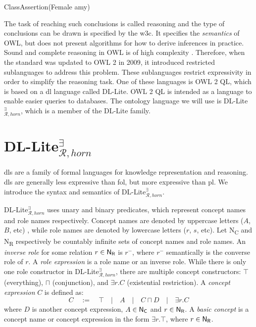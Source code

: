 \centerline{\textsf{ClassAssertion(Female amy)}}
The task of reaching such conclusions is called reasoning and the type of conclusions can be drawn is specified by the \gls{w3c}. It specifies the \emph{semantics} of OWL, but does not present algorithms for how to derive inferences in practice. Sound and complete reasoning in OWL is of high complexity \citeauthor{Krotzsch2012}. Therefore, when the standard was updated to OWL 2 in 2009, it introduced restricted sublanguages to address this problem. These sublanguages restrict expressivity in order to simplify the reasoning task. One of these languages is OWL 2 QL, which is based on a \gls{dl} language called DL-Lite. OWL 2 QL is intended as a language to enable easier queries to databases. The ontology language we will use is DL-Lite$_{\mathcal{R}, horn}^{\exists}$, which is a member of the DL-Lite family.

\section{DL-Lite$_{\mathcal{R}, horn}^{\exists}$}
\glspl{dl} are a family of formal languages for knowledge representation and reasoning. \glspl{dl} are generally less expressive than \gls{fol}, but more expressive than \gls{pl}. We introduce the syntax and semantics of  DL-Lite$_{\mathcal{R}, horn}^{\exists}$.

DL-Lite$_{\mathcal{R}, horn}^{\exists}$ uses unary and binary predicates, which represent concept names and role names respectively. Concept names are denoted by uppercase letters ($A$, $B$, etc) , while role names are denoted by lowercase letters ($r$, $s$, etc). Let \textsf{N\textsubscript{C}} and \textsf{N\textsubscript{R}} respectively be countably infinite sets of concept names and role names. An \emph{inverse role} for some relation $r \in \textsf{N\textsubscript{R}}$ is $r^-$, where $r^-$ semantically is the converse role of $r$. A \emph{role expression} is a role name or an inverse role. While there is only one role constructor in DL-Lite$_{\mathcal{R}, horn}^{\exists}$, there are multiple concept constructors: $\top$ (everything), $\sqcap$ (conjunction), and $\exists r.C$ (existential restriction). A \emph{concept expression} $C$ is defined as:
\[C \quad:=\quad \top\quad|\quad A \quad|\quad C\sqcap D\quad |\quad \exists r.C\]
where $D$ is another concept expression, $A\in \textsf{N\textsubscript{C}}$ and $r \in \textsf{N\textsubscript{R}}$. A \emph{basic concept} is a concept name or concept expression in the form $\exists r.\top$, where $r \in \textsf{N\textsubscript{R}}$. 

